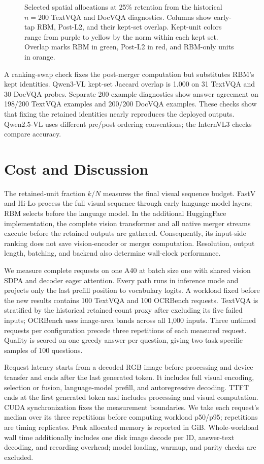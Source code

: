 \documentclass[10pt,twocolumn,letterpaper]{article}
\begin{document}
\begin{figure}[t]
\centering

\caption{\label{fig:survival}Selected spatial allocations at 25\% retention from the historical $n=200$ TextVQA and DocVQA diagnostics. Columns show early-tap RBM, Post-L2, and their kept-set overlap. Kept-unit colors range from purple to yellow by the norm within each kept set. Overlap marks RBM in green, Post-L2 in red, and RBM-only units in orange.}
\end{figure}

A ranking-swap check fixes the post-merger computation but substitutes RBM's kept identities. Qwen3-VL kept-set Jaccard overlap is 1.000 on 31 TextVQA and 30 DocVQA probes. Separate 200-example diagnostics show answer agreement on 198/200 TextVQA examples and 200/200 DocVQA examples. These checks show that fixing the retained identities nearly reproduces the deployed outputs. Qwen2.5-VL uses different pre/post ordering conventions; the InternVL3 checks compare accuracy.

\section{Cost and Discussion}
The retained-unit fraction $k/N$ measures the final visual sequence budget. FastV and Hi-Lo process the full visual sequence through early language-model layers; RBM selects before the language model. In the additional HuggingFace implementation, the complete vision transformer and all native merger streams execute before the retained outputs are gathered. Consequently, its input-side ranking does not save vision-encoder or merger computation. Resolution, output length, batching, and backend also determine wall-clock performance.

We measure complete requests on one A40 at batch size one with shared vision SDPA and decoder eager attention. Every path runs in inference mode and projects only the last prefill position to vocabulary logits. A workload fixed before the new results contains 100 TextVQA and 100 OCRBench requests. TextVQA is stratified by the historical retained-count proxy after excluding its five failed inputs; OCRBench uses image-area bands across all 1,000 inputs. Three untimed requests per configuration precede three repetitions of each measured request. Quality is scored on one greedy answer per question, giving two task-specific samples of 100 questions.

Request latency starts from a decoded RGB image before processing and device transfer and ends after the last generated token. It includes full visual encoding, selection or fusion, language-model prefill, and autoregressive decoding. TTFT ends at the first generated token and includes processing and visual computation. CUDA synchronization fixes the measurement boundaries. We take each request's median over its three repetitions before computing workload p50/p95; repetitions are timing replicates. Peak allocated memory is reported in GiB. Whole-workload wall time additionally includes one disk image decode per ID, answer-text decoding, and recording overhead; model loading, warmup, and parity checks are excluded.
\end{document}

